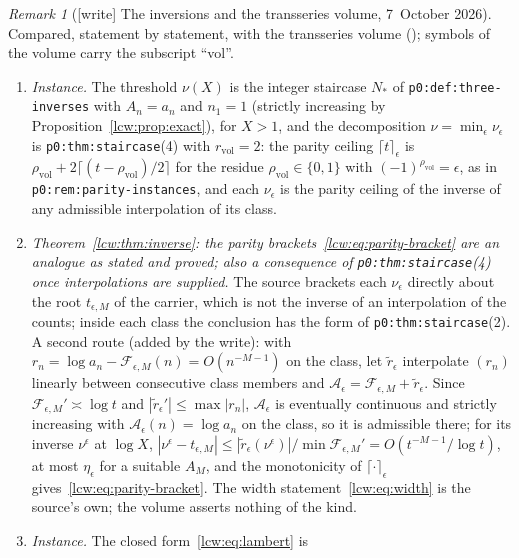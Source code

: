 \documentclass[11pt,letterpaper]{article}
\theoremstyle{remark}\newtheorem{remark}[theorem]{Remark}
\newcommand{\ceilp}[2]{\lceil #1\rceil_{#2}}
\newcommand{\file}[1]{\nolinkurl{#1}}
\begin{document}
\begin{remark}[{[write]} The inversions and the transseries volume, 7~October 2026]\label{lcw:rem:transseries}
Compared, statement by statement, with the transseries volume
();
symbols of the volume carry the subscript ``vol''.
\begin{enumerate}[label=(\alph*)]
\item \emph{Instance.} The threshold $\nu(X)$ is the integer staircase $N_\ast$
 of \file{p0:def:three-inverses} with $A_n=a_n$ and $n_1=1$ (strictly
 increasing by Proposition~\ref{lcw:prop:exact}), for $X>1$, and the
 decomposition $\nu=\min_\epsilon\nu_\epsilon$ is \file{p0:thm:staircase}(4)
 with $r_{\mathrm{vol}}=2$: the parity ceiling $\ceilp t\epsilon$ is
 $\rho_{\mathrm{vol}}+2\lceil(t-\rho_{\mathrm{vol}})/2\rceil$ for the residue
 $\rho_{\mathrm{vol}}\in\{0,1\}$ with $(-1)^{\rho_{\mathrm{vol}}}=\epsilon$, as
 in \file{p0:rem:parity-instances}, and each $\nu_\epsilon$ is the parity
 ceiling of the inverse of any admissible interpolation of its class.
\item \emph{Theorem~\ref{lcw:thm:inverse}: the parity
 brackets~\eqref{lcw:eq:parity-bracket} are an analogue as stated and proved;
 also a consequence of \file{p0:thm:staircase}(4) once interpolations are
 supplied.} The source brackets each $\nu_\epsilon$ directly about the root
 $t_{\epsilon,M}$ of the carrier, which is not the inverse of an interpolation
 of the counts; inside each class the conclusion has the form of
 \file{p0:thm:staircase}(2). A second route (added by the write): with
 $r_n=\log a_n-\mathcal F_{\epsilon,M}(n)=O(n^{-M-1})$ on the class, let
 $\tilde r_\epsilon$ interpolate $(r_n)$ linearly between consecutive class
 members and $\mathcal A_\epsilon=\mathcal F_{\epsilon,M}+\tilde r_\epsilon$.
 Since $\mathcal F_{\epsilon,M}'\asymp\log t$ and $|\tilde r_\epsilon'|\le\max|r_n|$,
 $\mathcal A_\epsilon$ is eventually continuous and strictly increasing with
 $\mathcal A_\epsilon(n)=\log a_n$ on the class, so it is admissible there; for
 its inverse $\nu^{\epsilon}$ at $\log X$,
 $|\nu^{\epsilon}-t_{\epsilon,M}|\le|\tilde r_\epsilon(\nu^\epsilon)|/\min\mathcal F_{\epsilon,M}'=O(t^{-M-1}/\log t)$,
 at most $\eta_\epsilon$ for a suitable $A_M$, and the monotonicity of
 $\ceilp\cdot\epsilon$ gives~\eqref{lcw:eq:parity-bracket}. The width
 statement~\eqref{lcw:eq:width} is the source's own; the volume asserts
 nothing of the kind.
\item \emph{Instance.} The closed form~\eqref{lcw:eq:lambert} is

\end{enumerate}
\end{remark}
\end{document}
